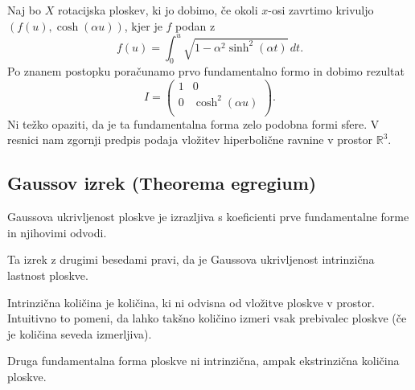 \begin{primer}
Naj bo $X$ rotacijska ploskev, ki jo dobimo, če okoli $x$-osi zavrtimo krivuljo $(f(u), \cosh (\alpha u))$, kjer je $f$ podan z \begin{equation*}
f(u) = \int_{0}^{u} \sqrt{1 - \alpha^2 \sinh^2(\alpha t)}  \, dt. 
\end{equation*}  
Po znanem postopku poračunamo prvo fundamentalno formo in dobimo rezultat \begin{equation*}
    I = \begin{pmatrix}
        1 & 0\\
        0 & \cosh^2 (\alpha u)\\
    \end{pmatrix}.
\end{equation*}
Ni težko opaziti, da je ta fundamentalna forma zelo podobna formi sfere. V resnici nam zgornji predpis podaja vložitev hiperbolične ravnine v prostor $\mathbb{R}^3$. 
\end{primer}

\subsection{Gaussov izrek (Theorema egregium)}

\begin{izrek}
\label{izr_theorema_egregium}
Gaussova ukrivljenost ploskve je izrazljiva s koeficienti prve fundamentalne forme in njihovimi odvodi.
\end{izrek}

\begin{opomba}
Ta izrek z drugimi besedami pravi, da je Gaussova ukrivljenost intrinzična lastnost ploskve. 
\end{opomba}

\begin{definicija}
\label{def_intrinzicna_kolicina}
Intrinzična količina je količina, ki ni odvisna od vložitve ploskve v prostor. Intuitivno to pomeni, da lahko takšno količino izmeri vsak prebivalec ploskve (če je količina seveda izmerljiva).
\end{definicija}

\begin{opomba}
Druga fundamentalna forma ploskve ni intrinzična, ampak ekstrinzična količina ploskve.
\end{opomba}

